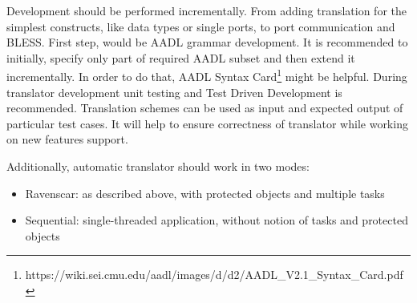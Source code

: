 Development should be performed incrementally. From adding translation for the simplest constructs, like data types or single ports, to port communication and BLESS. First step, would be AADL grammar development. It is recommended to initially, specify only part of required AADL subset and then extend it incrementally. In order to do that, AADL Syntax Card\footnote{https://wiki.sei.cmu.edu/aadl/images/d/d2/AADL\_V2.1\_Syntax\_Card.pdf} might be helpful. During translator development unit testing and Test Driven Development is recommended. Translation schemes can be used as input and expected output of particular test cases. It will help to ensure correctness of translator while working on new features support.

Additionally, automatic translator should work in two modes:
\begin{itemize}
	\item Ravenscar: as described above, with protected objects and multiple tasks
	\item Sequential: single-threaded application, without notion of tasks and protected objects	
\end{itemize}

